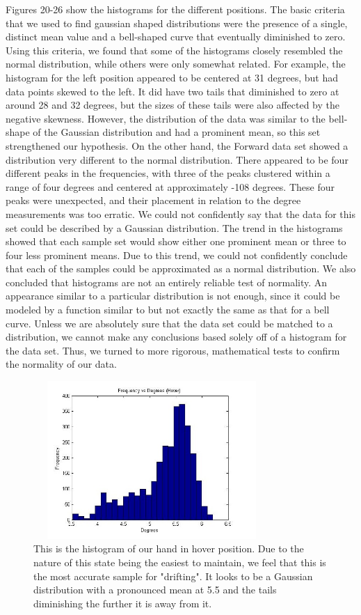 \documentclass[letterpaper,english, 12pt]{article}
\begin{document}
Figures 20-26 show the histograms for the different positions. The basic criteria that we used to find gaussian shaped distributions were the presence of a single, distinct mean value and a bell-shaped curve that eventually diminished to zero. Using this criteria, we found that some of the histograms closely resembled the normal distribution, while others were only somewhat related. For example, the histogram for the left position appeared to be centered at 31 degrees, but had data points skewed to the left. It did have two tails that diminished to zero at around 28 and 32 degrees, but the sizes of these tails were also affected by the negative skewness.  However, the distribution of the data was similar to the bell-shape of the Gaussian distribution and had a prominent mean, so this set strengthened our hypothesis. On the other hand, the Forward data set showed a distribution very different to the normal distribution. There appeared to be four different peaks in the frequencies, with three of the peaks clustered within a range of four degrees and centered at approximately -108 degrees. These four peaks were unexpected, and their placement in relation to the degree measurements was too erratic. We could not confidently say that the data for this set could be described by a Gaussian distribution. The trend in the histograms showed that each sample set would show either one prominent mean or three to four less prominent means. Due to this trend, we could not confidently conclude that each of the samples could be approximated as a normal distribution. We also concluded that histograms are not an entirely reliable test of normality. An appearance similar to a particular distribution is not enough, since it could be modeled by a function similar to but not exactly the same as that for a bell curve. Unless we are absolutely sure that the data set could be matched to a distribution, we cannot make any conclusions based solely off of a histogram for the data set. Thus, we turned to more rigorous, mathematical tests to confirm the normality of our data.

\begin{figure}[H]
	\centering
	\includegraphics[height=6cm,width=90mm]{pics/hoverHistogram1.jpg}
	\caption{This is the histogram of our hand in hover position. Due to the nature of this state being the easiest to maintain, we feel that this is the most accurate sample for "drifting". It looks to be a Gaussian distribution with a pronounced mean at 5.5 and the tails diminishing the further it is away from it.}
	\centering
\end{figure}
\end{document}
